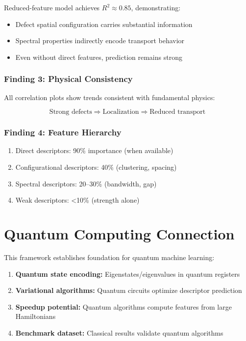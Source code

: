 \documentclass[11pt,a4paper]{article}
\begin{document}
Reduced-feature model achieves $R^2 \approx 0.85$, demonstrating:
\begin{itemize}
    \item Defect spatial configuration carries substantial information
    \item Spectral properties indirectly encode transport behavior
    \item Even without direct features, prediction remains strong
\end{itemize}

\subsubsection{Finding 3: Physical Consistency}

All correlation plots show trends consistent with fundamental physics:

\begin{equation}
\text{Strong defects} \Rightarrow \text{Localization} \Rightarrow \text{Reduced transport}
\end{equation}

\subsubsection{Finding 4: Feature Hierarchy}

\begin{enumerate}
    \item Direct descriptors: 90\% importance (when available)
    \item Configurational descriptors: 40\% (clustering, spacing)
    \item Spectral descriptors: 20--30\% (bandwidth, gap)
    \item Weak descriptors: <10\% (strength alone)
\end{enumerate}

\newpage
\section{Quantum Computing Connection}

This framework establishes foundation for quantum machine learning:

\begin{enumerate}
    \item \textbf{Quantum state encoding:} Eigenstates/eigenvalues in quantum registers
    \item \textbf{Variational algorithms:} Quantum circuits optimize descriptor prediction
    \item \textbf{Speedup potential:} Quantum algorithms compute features from large Hamiltonians
    \item \textbf{Benchmark dataset:} Classical results validate quantum algorithms
\end{enumerate}
\end{document}
